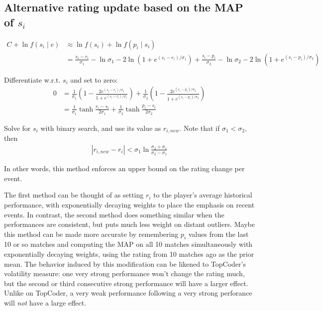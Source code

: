 \documentclass{article}
\begin{document}
\subsection{Alternative rating update based on the MAP of $s_i$}

\begin{align}
C + \ln f(s_i \mid e) &\approx \ln f(s_i) + \ln f(p_i\mid s_i)
\\&= \frac{s_i-r_i}{\sigma_1} - \ln \sigma_1 - 2\ln\left(1 + e^{(s_i-r_i)/\sigma_1} \right)
	+\frac{s_i-p_i}{\sigma_2} - \ln \sigma_2 - 2\ln\left(1 + e^{(s_i-p_i)/\sigma_2} \right)
\end{align}

Differentiate w.r.t. $s_i$ and set to zero:
\begin{align}
0 &= \frac{1}{\sigma_1}\left( 1 - \frac {2e^{(s_i-r_i)/\sigma_1}} {1 + e^{(s_i-r_i)/\sigma_1}} \right)
	+ \frac{1}{\sigma_2}\left( 1 - \frac {2e^{(s_i-p_i)/\sigma_2}} {1 + e^{(s_i-p_i)/\sigma_2}} \right)
\\ &= \frac{1}{\sigma_1} \tanh \frac {r_i-s_i} {2\sigma_1}
	+ \frac{1}{\sigma_2} \tanh \frac {p_i-s_i} {2\sigma_2}
\end{align}

Solve for $s_i$ with binary search, and use its value as $r_{i,new}$. Note that if $\sigma_1 < \sigma_2$, then
\begin{align}
|r_{i,new} - r_i| < \sigma_1 \ln\frac {\sigma_2+\sigma_1} {\sigma_2-\sigma_1}
\end{align}

In other words, this method enforces an upper bound on the rating change per event.

The first method can be thought of as setting $r_i$ to the player's average historical performance, with exponentially decaying weights to place the emphasis on recent events. In contrast, the second method does something similar when the performances are consistent, but puts much less weight on distant outliers. Maybe this method can be made more accurate by remembering $p_i$ values from the last 10 or so matches and computing the MAP on all 10 matches simultaneously with exponentially decaying weights, using the rating from 10 matches ago as the prior mean. The behavior induced by this modification can be likened to TopCoder's volatility measure: one very strong performance won't change the rating much, but the second or third consecutive strong performance will have a larger effect. Unlike on TopCoder, a very weak performance following a very strong perforance will \emph{not} have a large effect.
\end{document}
